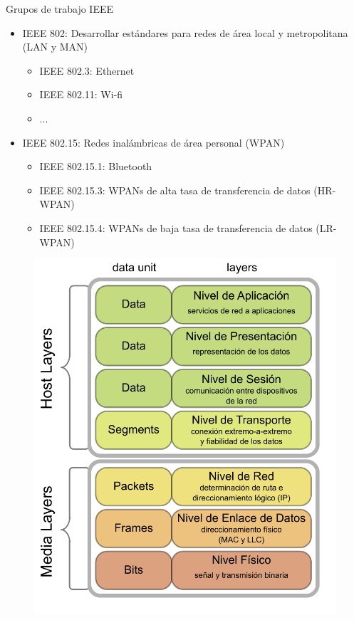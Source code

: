 \documentclass[aspectratio=169]{beamer}
\begin{document}
\begin{frame}{Grupos de trabajo IEEE} 

\begin{minipage}[c]{1.0\linewidth}
	\begin{minipage}[c]{0.6\linewidth}
		\begin{itemize}
			\item IEEE 802: Desarrollar estándares para redes de área local y metropolitana (LAN y MAN)
			\begin{itemize}
				\item IEEE 802.3: Ethernet
				\item IEEE 802.11: Wi-fi
				\item ...
			\end{itemize}
			\vspace{10px}
			\item IEEE 802.15: Redes inalámbricas de área personal (WPAN)
			\vspace{5px}
			\begin{itemize}
				\item IEEE 802.15.1: Bluetooth
				\item IEEE 802.15.3: WPANs de alta tasa de transferencia de datos (HR-WPAN)			
				\item IEEE 802.15.4: WPANs de baja tasa de transferencia de datos (LR-WPAN)
			\end{itemize}
		\end{itemize}
	\end{minipage}
	\begin{minipage}[c]{0.35\linewidth}
		\begin{figure}[H]
			\includegraphics[width=1\textwidth]{./imagenes/OSI_Model_v1.pdf}
		\end{figure}	  	  	
	\end{minipage}
\end{minipage}
	

\end{frame}
\end{document}
